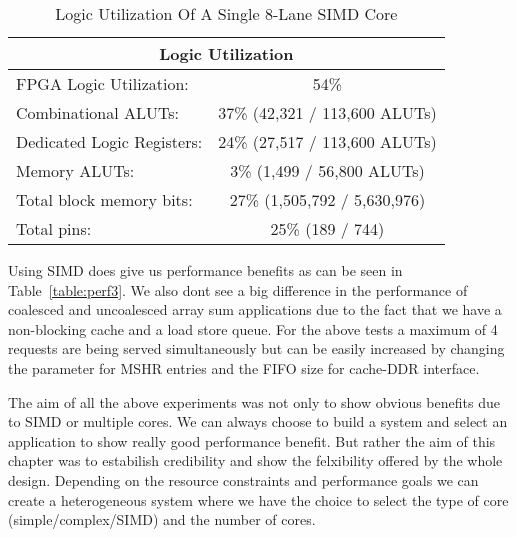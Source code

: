\begin{table}[!htbp]
  \centering
  \begin{tabular}{|l|c|}
    \hline
    \multicolumn{2}{|c|}{Logic Utilization} \\
    \hline
FPGA Logic Utilization:		& 54\% 	\\
   Combinational ALUTs:		& 37\% 	(42,321 / 113,600 ALUTs)\\
   Dedicated Logic Registers:	& 24\% 	(27,517 / 113,600 ALUTs)\\
   Memory ALUTs:		& 3\% 	(1,499 / 56,800 ALUTs)\\
Total block memory bits:	& 27\%  (1,505,792 / 5,630,976)\\
Total pins:			& 25\% 	(189 / 744)\\
    \hline
  \end{tabular}
  \caption{Logic Utilization Of A Single 8-Lane SIMD Core}
  \label{table:fpga_util3}
\end{table}

Using SIMD does give us performance benefits as can be seen in  Table~\ref{table:perf3}. We also dont see a big difference in the performance of coalesced and uncoalesced array sum applications due to the fact that we have a non-blocking cache and a load store queue. For the above tests a maximum of 4 requests are being served simultaneously but can be easily increased by changing the parameter for MSHR entries and the FIFO size for cache-DDR interface.

The aim of all the above experiments was not only to show obvious benefits due to SIMD or multiple cores. We can always choose to build a system and select an  application to show really good performance benefit. But rather the aim of this chapter was to estabilish credibility and show the felxibility offered by the whole design. Depending on the resource constraints and performance goals we can create a heterogeneous system where we have the choice to select the type of core (simple/complex/SIMD) and the number of cores.
